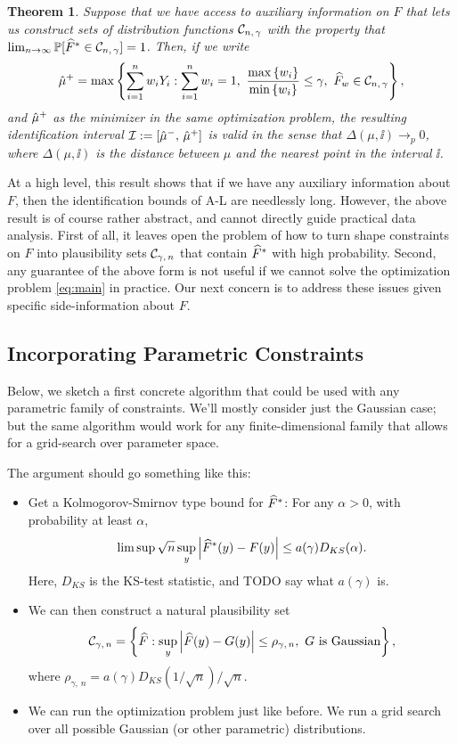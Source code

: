 \documentclass{article}
\theoremstyle{plain}
\newtheorem{theo}[prop]{Theorem}
\theoremstyle{definition}
\theoremstyle{remark}
\begin{document}
\begin{theo}
\label{theo:main}
Suppose that we have access to auxiliary information on $F$ that lets us construct
sets of distribution functions $\mathcal{C}_{n, \, \gamma}$ with the property that
$\lim_{n \rightarrow \infty} \mathbb{P}[\widehat{F}^* \in \mathcal{C}_{n, \, \gamma}] = 1$.
Then, if we write
\begin{equation}
\label{eq:main}
\hmu^+ = \max\cb{\sum_{i = 1}^n w_i Y_i : \sum_{i = 1}^n w_i = 1, \ \frac{\max\cb{w_i}}{\min\cb{w_i}} \leq \gamma, \ \hF_w \in \cset_{n, \, \gamma}},
\end{equation}
and $\hat{\mu}^+$ as the minimizer in the same optimization problem,
the resulting identification interval $\mathcal{I} := [\hat{\mu}^-,\, \hat{\mu}^+]$ is
valid in the sense that $\Delta(\mu, \ii) \rightarrow_p 0$, where
$\Delta(\mu, \ii)$ is the distance between $\mu$ and the nearest point in the interval $\ii$.
\end{theo}

At a high level, this result shows that if we have any auxiliary information about $F$, then
the identification bounds of A-L are needlessly long.
However, the above result is of course rather abstract, and cannot directly guide practical data
analysis. First of all, it leaves open the problem of how to turn shape constraints on $F$
into plausibility sets $\mathcal{C}_{\gamma, \, n}$ that contain $\widehat{F}^*$ with high probability.
Second, any guarantee of the above form is not useful if we cannot solve the optimization
problem \eqref{eq:main} in practice.
Our next concern is to address these issues given specific side-information about $F$.

\subsection{Incorporating Parametric Constraints}

Below, we sketch a first concrete algorithm that could be used with any parametric family of constraints.
We'll mostly consider just the Gaussian case; but the same algorithm would work for
any finite-dimensional family that allows for a grid-search over parameter space.

The argument should go something like this:
\begin{itemize}
\item Get a Kolmogorov-Smirnov type bound for $\widehat{F}^*$: For any $\alpha > 0$,
with probability at least $\alpha$,
$$ \limsup \sqrt{n} \sup_{y} \left\lvert\widehat{F}^*(y) - F(y)\right\rvert \leq a(\gamma) D_{KS}(\alpha). $$
Here, $D_{KS}$ is the KS-test statistic, and TODO say what $a(\gamma)$ is.
\item We can then construct a natural plausibility set
$$ \mathcal{C}_{\gamma, \, n} = \left\{\widehat{F} : \sup_{y} \left\lvert\widehat{F}(y) - G(y)\right\rvert \leq \rho_{\gamma,\, n}, \ G \text{ is Gaussian}\right\}, $$
where $\rho_{\gamma, \, n} = a(\gamma) D_{KS}(1/\sqrt{n})/\sqrt{n}$.
\item We can run the optimization problem just like before. We run a grid search over all
possible Gaussian (or other parametric) distributions.
\end{itemize}
\end{document}
